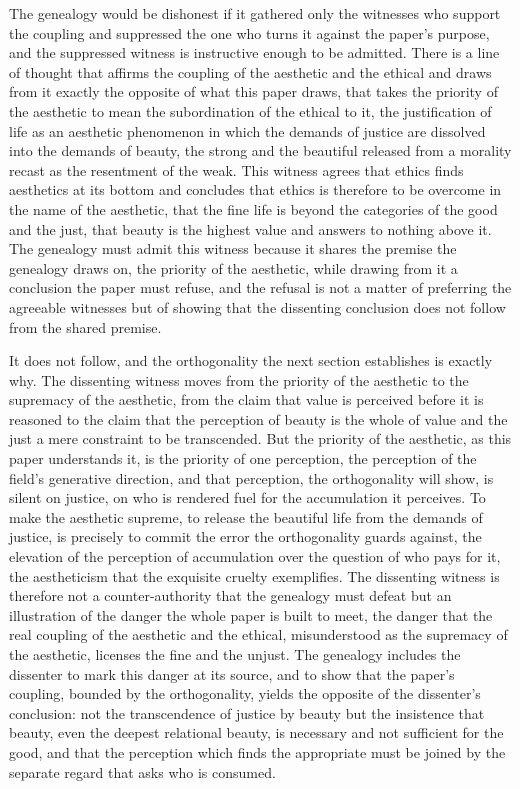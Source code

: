 The genealogy would be dishonest if it gathered only the witnesses who support the coupling and suppressed the one who turns it against the paper's purpose, and the suppressed witness is instructive enough to be admitted. There is a line of thought that affirms the coupling of the aesthetic and the ethical and draws from it exactly the opposite of what this paper draws, that takes the priority of the aesthetic to mean the subordination of the ethical to it, the justification of life as an aesthetic phenomenon in which the demands of justice are dissolved into the demands of beauty, the strong and the beautiful released from a morality recast as the resentment of the weak. This witness agrees that ethics finds aesthetics at its bottom and concludes that ethics is therefore to be overcome in the name of the aesthetic, that the fine life is beyond the categories of the good and the just, that beauty is the highest value and answers to nothing above it. The genealogy must admit this witness because it shares the premise the genealogy draws on, the priority of the aesthetic, while drawing from it a conclusion the paper must refuse, and the refusal is not a matter of preferring the agreeable witnesses but of showing that the dissenting conclusion does not follow from the shared premise.

It does not follow, and the orthogonality the next section establishes is exactly why. The dissenting witness moves from the priority of the aesthetic to the supremacy of the aesthetic, from the claim that value is perceived before it is reasoned to the claim that the perception of beauty is the whole of value and the just a mere constraint to be transcended. But the priority of the aesthetic, as this paper understands it, is the priority of one perception, the perception of the field's generative direction, and that perception, the orthogonality will show, is silent on justice, on who is rendered fuel for the accumulation it perceives. To make the aesthetic supreme, to release the beautiful life from the demands of justice, is precisely to commit the error the orthogonality guards against, the elevation of the perception of accumulation over the question of who pays for it, the aestheticism that the exquisite cruelty exemplifies. The dissenting witness is therefore not a counter-authority that the genealogy must defeat but an illustration of the danger the whole paper is built to meet, the danger that the real coupling of the aesthetic and the ethical, misunderstood as the supremacy of the aesthetic, licenses the fine and the unjust. The genealogy includes the dissenter to mark this danger at its source, and to show that the paper's coupling, bounded by the orthogonality, yields the opposite of the dissenter's conclusion: not the transcendence of justice by beauty but the insistence that beauty, even the deepest relational beauty, is necessary and not sufficient for the good, and that the perception which finds the appropriate must be joined by the separate regard that asks who is consumed.

